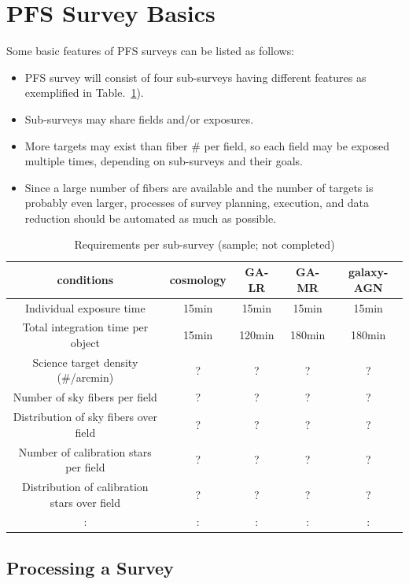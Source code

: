 \documentclass[a4paper,notitlepage]{article}
\begin{document}
\section{PFS Survey Basics}

Some basic features of PFS surveys can be listed as follows:
\begin{itemize}
 \item PFS survey will consist of four sub-surveys having different
       features as exemplified in
       Table.~\ref{tab:sciops-scireq-subsvy}).
 \item Sub-surveys may share fields and/or exposures.
 \item More targets may exist than fiber \# per field, so each field
       may be exposed multiple times, depending on sub-surveys and
       their goals.
 \item Since a large number of fibers are available and the number of
       targets is probably even larger, processes of survey planning,
       execution, and data reduction should be automated as much as
       possible.
\end{itemize}

\begin{table}[htb]
\caption{Requirements per sub-survey (sample; not completed)}
\label{tab:sciops-scireq-subsvy}
\begin{center}
\begin{tabular}{c|c|c|c|c}
conditions & cosmology & GA-LR & GA-MR & galaxy-AGN \\ \hline
\hline
Individual exposure time & 15min & 15min & 15min & 15min \\
\hline
Total integration time per object & 15min & 120min & 180min & 180min \\
\hline
Science target density (\#/arcmin) & ? & ? & ? & ? \\
\hline
Number of sky fibers per field & ? & ? & ? & ? \\
\hline
Distribution of sky fibers over field & ? & ? & ? & ? \\
\hline
Number of calibration stars per field & ? & ? & ? & ? \\
\hline
Distribution of calibration stars over field & ? & ? & ? & ? \\
\hline
 : & : & : & : & : \\
\end{tabular}
\end{center}
\end{table}

\subsection{Processing a Survey}
\end{document}
